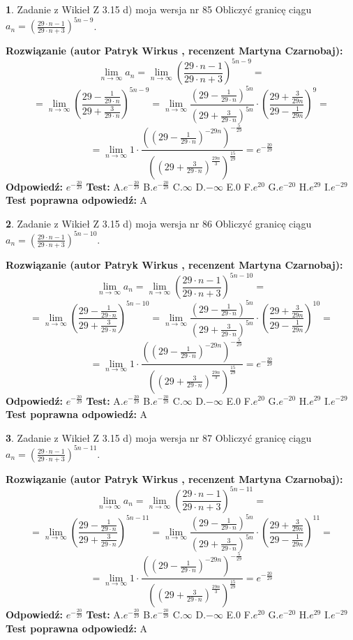 \documentclass[12pt, a4paper]{article}
\theoremstyle{definition} %
\newtheorem{zad}{}
\newcommand{\zadStart}[1]{\begin{zad}#1\newline}
\newcommand{\zadStop}{\end{zad}}
\newcommand{\rozwStart}[2]{\noindent \textbf{Rozwiązanie (autor #1 , recenzent #2): }\newline}
\newcommand{\rozwStop}{\newline}
\newcommand{\odpStart}{\noindent \textbf{Odpowiedź:}\newline}
\newcommand{\odpStop}{\newline}
\newcommand{\testStart}{\noindent \textbf{Test:}\newline}
\newcommand{\testStop}{\newline}
\newcommand{\kluczStart}{\noindent \textbf{Test poprawna odpowiedź:}\newline}
\newcommand{\kluczStop}{\newline}
\begin{document}
\zadStart{Zadanie z Wikieł Z 3.15 d) moja wersja nr 85}
Obliczyć granicę ciągu $a_{n}=(\frac{29\cdot n - 1}{29 \cdot n + 3})^{5n-9}$.
\zadStop
\rozwStart{Patryk Wirkus}{Martyna Czarnobaj}
$$\lim\limits_{n\to\infty} a_{n} = \lim\limits_{n\to\infty}(\frac{29\cdot n - 1}{29 \cdot n + 3})^{5n-9}=$$
$$=\lim\limits_{n\to\infty}(\frac{29 - \frac{1}{29\cdot n}}{29 + \frac{3}{29 \cdot n}})^{5n-9}=\lim\limits_{n\to\infty}\frac{(29 - \frac{1}{29\cdot n})^{5n}}{(29 + \frac{3}{29\cdot n})^{5n}} \cdot (\frac{29+\frac{3}{29n}}{29-\frac{1}{29n}})^{9}=$$
$$=\lim\limits_{n\to\infty} 1 \cdot \frac{((29-\frac{1}{29 \cdot n})^{-29n})^{-\frac{5}{29}}}{((29+\frac{3}{29 \cdot n})^{\frac{29n}{3}})^{\frac{15}{29}}} =e^{-\frac{20}{29}}$$
\rozwStop
\odpStart
$e^{-\frac{20}{29}}$
\odpStop
\testStart
A.$ e^{-\frac{20}{29}}$
B.$ e^{-\frac{20}{29}}$
C.$\infty$
D.$-\infty$
E.$0$
F.$e^{20}$
G.$e^{-20}$
H.$e^{29}$
I.$e^{-29}$
\testStop
\kluczStart
A
\kluczStop



\zadStart{Zadanie z Wikieł Z 3.15 d) moja wersja nr 86}
Obliczyć granicę ciągu $a_{n}=(\frac{29\cdot n - 1}{29 \cdot n + 3})^{5n-10}$.
\zadStop
\rozwStart{Patryk Wirkus}{Martyna Czarnobaj}
$$\lim\limits_{n\to\infty} a_{n} = \lim\limits_{n\to\infty}(\frac{29\cdot n - 1}{29 \cdot n + 3})^{5n-10}=$$
$$=\lim\limits_{n\to\infty}(\frac{29 - \frac{1}{29\cdot n}}{29 + \frac{3}{29 \cdot n}})^{5n-10}=\lim\limits_{n\to\infty}\frac{(29 - \frac{1}{29\cdot n})^{5n}}{(29 + \frac{3}{29\cdot n})^{5n}} \cdot (\frac{29+\frac{3}{29n}}{29-\frac{1}{29n}})^{10}=$$
$$=\lim\limits_{n\to\infty} 1 \cdot \frac{((29-\frac{1}{29 \cdot n})^{-29n})^{-\frac{5}{29}}}{((29+\frac{3}{29 \cdot n})^{\frac{29n}{3}})^{\frac{15}{29}}} =e^{-\frac{20}{29}}$$
\rozwStop
\odpStart
$e^{-\frac{20}{29}}$
\odpStop
\testStart
A.$ e^{-\frac{20}{29}}$
B.$ e^{-\frac{20}{29}}$
C.$\infty$
D.$-\infty$
E.$0$
F.$e^{20}$
G.$e^{-20}$
H.$e^{29}$
I.$e^{-29}$
\testStop
\kluczStart
A
\kluczStop



\zadStart{Zadanie z Wikieł Z 3.15 d) moja wersja nr 87}
Obliczyć granicę ciągu $a_{n}=(\frac{29\cdot n - 1}{29 \cdot n + 3})^{5n-11}$.
\zadStop
\rozwStart{Patryk Wirkus}{Martyna Czarnobaj}
$$\lim\limits_{n\to\infty} a_{n} = \lim\limits_{n\to\infty}(\frac{29\cdot n - 1}{29 \cdot n + 3})^{5n-11}=$$
$$=\lim\limits_{n\to\infty}(\frac{29 - \frac{1}{29\cdot n}}{29 + \frac{3}{29 \cdot n}})^{5n-11}=\lim\limits_{n\to\infty}\frac{(29 - \frac{1}{29\cdot n})^{5n}}{(29 + \frac{3}{29\cdot n})^{5n}} \cdot (\frac{29+\frac{3}{29n}}{29-\frac{1}{29n}})^{11}=$$
$$=\lim\limits_{n\to\infty} 1 \cdot \frac{((29-\frac{1}{29 \cdot n})^{-29n})^{-\frac{5}{29}}}{((29+\frac{3}{29 \cdot n})^{\frac{29n}{3}})^{\frac{15}{29}}} =e^{-\frac{20}{29}}$$
\rozwStop
\odpStart
$e^{-\frac{20}{29}}$
\odpStop
\testStart
A.$ e^{-\frac{20}{29}}$
B.$ e^{-\frac{20}{29}}$
C.$\infty$
D.$-\infty$
E.$0$
F.$e^{20}$
G.$e^{-20}$
H.$e^{29}$
I.$e^{-29}$
\testStop
\kluczStart
A
\kluczStop
\end{document}
